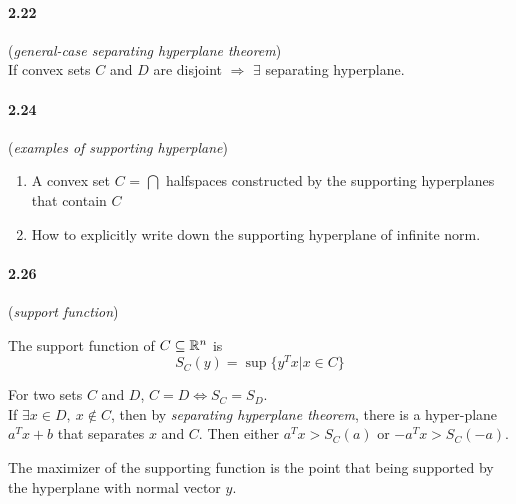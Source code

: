 \documentclass[11pt]{article}
\begin{document}
\paragraph{2.22}({\it general-case separating hyperplane theorem})\\
\goal If convex sets $C$ and $D$ are disjoint $\Rightarrow$ $\exists$ separating hyperplane.

\paragraph{2.24}({\it examples of supporting hyperplane})\\
\begin{enumerate}[label=(\alph*)]
	\item A convex set $C$ = $\bigcap$ halfspaces constructed by the supporting hyperplanes that contain $C$
	\item How to explicitly write down the supporting hyperplane of infinite norm.
\end{enumerate}

\paragraph{2.26}({\it support function})\\
\begin{definition}
	The support function of $C\subseteq {\mathbb R}^n$ is
	$$S_C(y) = \sup\{y^Tx|x\in C\}$$
\end{definition}
\goal For two sets $C$ and $D$, $C=D\Leftrightarrow S_C=S_D$.\\
\proofidea If $\exists x\in D,\ x\notin C$, then by {\it separating hyperplane theorem}, there is a hyper-plane $a^Tx+b$ that separates $x$ and $C$. Then either $a^Tx > S_C(a)$ or $-a^Tx > S_C(-a)$.
\begin{intuition}
	The maximizer of the supporting function is the point that being supported by the hyperplane with normal vector $y$.
\end{intuition}
\end{document}
